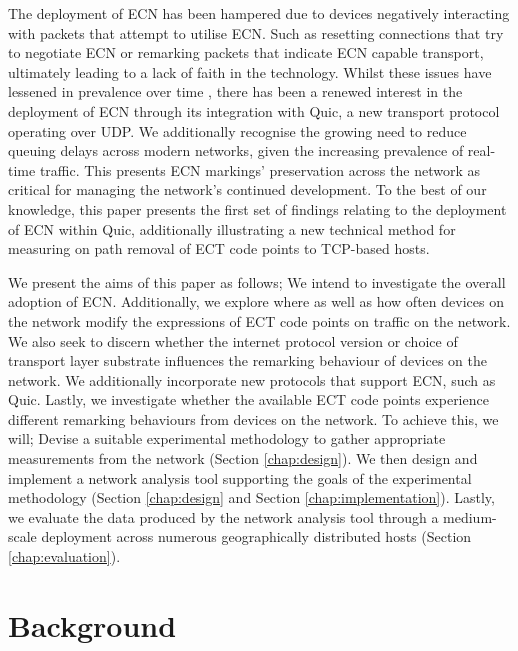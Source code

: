 \documentclass{l4proj}
\begin{document}
The deployment of ECN has been hampered due to devices negatively interacting with packets that attempt to utilise ECN. Such as resetting connections that try to negotiate ECN or remarking packets that indicate ECN capable transport\cite{floyd_inappropriate_2002}, ultimately leading to a lack of faith in the technology. Whilst these issues have lessened in prevalence over time \cite{trammell_enabling_2015}, there has been a renewed interest in the deployment of ECN through its integration with Quic, a new transport protocol operating over UDP\cite{johansson_ecn_2017}. We additionally recognise the growing need to reduce queuing delays across modern networks, given the increasing prevalence of real-time traffic. This presents ECN markings' preservation across the network as critical for managing the network's continued development. To the best of our knowledge, this paper presents the first set of findings relating to the deployment of ECN within Quic, additionally illustrating a new technical method for measuring on path removal of ECT code points to TCP-based hosts.

We present the aims of this paper as follows; We intend to investigate the overall adoption of ECN. Additionally, we explore where as well as how often devices on the network modify the expressions of ECT code points on traffic on the network. We also seek to discern whether the internet protocol version or choice of transport layer substrate influences the remarking behaviour of devices on the network. We additionally incorporate new protocols that support ECN, such as Quic. Lastly, we investigate whether the available ECT code points experience different remarking behaviours from devices on the network. To achieve this, we will; Devise a suitable experimental methodology to gather appropriate measurements from the network (Section \ref{chap:design}). We then design and implement a network analysis tool supporting the goals of the experimental methodology (Section \ref{chap:design} and Section \ref{chap:implementation}). Lastly, we evaluate the data produced by the network analysis tool through a medium-scale deployment across numerous geographically distributed hosts (Section \ref{chap:evaluation}).

\clearpage


\chapter{Background}
\label{chap:background}
\end{document}
